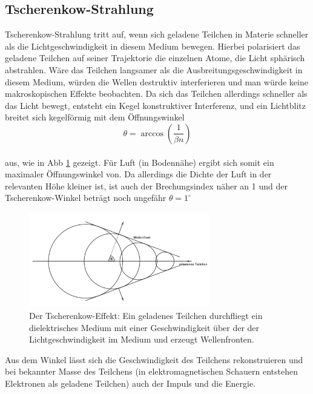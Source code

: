 \subsection{Tscherenkow-Strahlung}
Tscherenkow-Strahlung tritt auf, wenn sich geladene Teilchen in Materie schneller als die Lichtgeschwindigkeit in diesem Medium bewegen. Hierbei polarisiert das geladene Teilchen auf seiner Trajektorie die einzelnen Atome, die Licht sphärisch abstrahlen. Wäre das Teilchen langsamer als die Ausbreitungsgeschwindigkeit in diesem Medium, würden die Wellen destruktiv interferieren und man würde keine makroskopischen Effekte beobachten. Da sich das Teilchen allerdings schneller als das Licht bewegt, entsteht ein Kegel konstruktiver Interferenz, und ein Lichtblitz breitet sich kegelförmig mit dem Öffnungswinkel
\begin{equation}
\theta = \arccos\left(\frac{1}{\beta n}\right) \label{eq:cherenkow}
\end{equation}\\
aus, wie in Abb \ref{img:cherenkow} gezeigt. Für Luft (in Bodennähe) ergibt sich somit ein maximaler Öffnungswinkel von. Da allerdings die Dichte der Luft in der relevanten Höhe kleiner ist, ist auch der Brechungsindex näher an 1 und der Tscherenkow-Winkel beträgt noch ungefähr $\theta = 1^{\circ}$\cite{Grupen}
\begin{figure}[htbp]
\centering
\includegraphics[width=0.7\textwidth]{Images/cherenkow.png}
\caption{Der Tscherenkow-Effekt: Ein geladenes Teilchen durchfliegt ein dielektrisches Medium mit einer Geschwindigkeit über der der Lichtgeschwindigkeit im Medium und erzeugt Wellenfronten.}
\label{img:cherenkow}
\end{figure}
Aus dem Winkel lässt sich die Geschwindigkeit des Teilchens rekonstruieren und bei bekannter Masse des Teilchens (in elektromagnetischen Schauern entstehen Elektronen als geladene Teilchen) auch der Impuls und die Energie.

